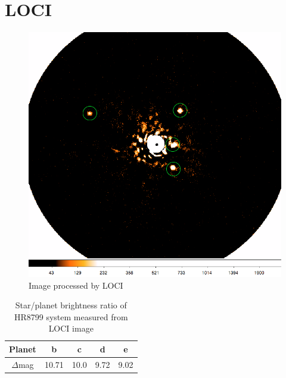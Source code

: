 \documentclass[paper=letter, fontsize=11pt]{scrartcl} %
\numberwithin{equation}{section} %
\numberwithin{figure}{section} %
\numberwithin{table}{section} %
\begin{document}
   \section{LOCI}
   \begin{figure}
     \centering
    \includegraphics[width=\textwidth]{loci}
     \caption{Image processed by LOCI}
     \label{fig:loci}
   \end{figure}

   \begin{table}[h]
     \centering
          \caption{Star/planet brightness ratio of HR8799 system measured
       from LOCI image}
     \begin{tabular}{|c|c|c|c|c|}
       \hline
       Planet&b&c&d&e\\\hline
       $\Delta$mag&10.71&10.0&9.72&9.02\\\hline
     \end{tabular}
     \label{tab:ratio}
   \end{table}
\end{document}
